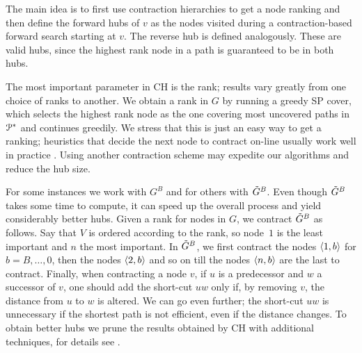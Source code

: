 The main idea is to first use contraction hierarchies to get a node ranking and then define the forward hubs of $v$ as the nodes visited during a contraction-based forward search starting at $v$.
The reverse hub is defined analogously.
These are valid hubs, since the highest rank node in a path is guaranteed to be in both hubs.

The most important parameter in CH is the rank; results vary greatly from one choice of ranks to another.
We obtain a rank in $G$ by running a greedy SP cover, which selects the highest rank node as the one covering most uncovered paths in $\mathcal{P}^*$ and continues greedily.
We stress that this is just an easy way to get a ranking; heuristics that decide the next node to contract on-line usually work well in practice \cite{goldberg_survey,rice_csp}.
Using another contraction scheme may expedite our algorithms and reduce the hub size.

For some instances we work with $G^B$ and for others with $\tilde G^B$.
Even though $\tilde G^B$ takes some time to compute, it can speed up the overall process and yield considerably better hubs. 
Given a rank for nodes in $G$, we contract $\tilde G^B$ as follows.
Say that $V$ is ordered according to the rank, so node~$1$ is the least important and $n$ the most important.
In $\tilde G^B$, we first contract the nodes $\langle1,b\rangle$ for $b=B,\ldots,0$, then the nodes $\langle2,b\rangle$ and so on till the nodes $\langle n,b\rangle$ are the last to contract. 
Finally, when contracting a node $v$, if $u$ is a predecessor and $w$ a successor of $v$, one should add the short-cut $uw$ only if, by removing $v$, the distance from $u$ to $w$ is altered.
We can go even further; the short-cut $uw$ is unnecessary if the shortest path is not efficient, even if the distance changes.
To obtain better hubs we prune the results obtained by CH with additional techniques, for details see \cite{TechReport}.

